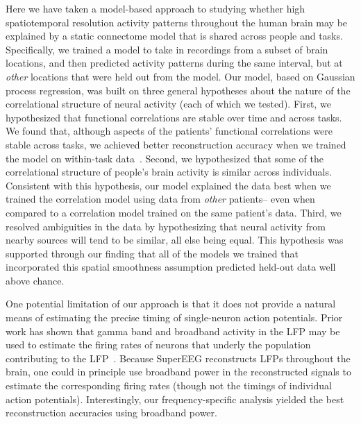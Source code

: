 \documentclass[11pt]{article}
\begin{document}
Here we have taken a model-based approach to studying whether high
spatiotemporal resolution activity patterns throughout the human brain
may be explained by a static connectome model that is shared across
people and tasks.  Specifically, we trained a model to take in
recordings from a subset of brain locations, and then predicted
activity patterns during the same interval, but at \textit{other}
locations that were held out from the model.  Our model, based on
Gaussian process regression, was built on three general hypotheses
about the nature of the correlational structure of neural activity
(each of which we tested).  First, we hypothesized that functional
correlations are stable over time and across tasks.  We found that,
although aspects of the patients' functional correlations were
stable across tasks, we achieved better reconstruction accuracy when
we trained the model on within-task data~\citep[we acknowledge that
our general approach could potentially be extended to better model
across-task changes, following][and others]{ColeEtal16, TavoEtal16}.
Second, we hypothesized that some of the correlational structure of
people's brain activity is similar across individuals.  Consistent
with this hypothesis, our model explained the data best when we
trained the correlation model using data from \textit{other}
patients-- even when compared to a correlation model trained on the
same patient's data.  Third, we resolved ambiguities in the data by
hypothesizing that neural activity from nearby sources will tend to be
similar, all else being equal.  This hypothesis was supported through
our finding that all of the models we trained that incorporated this
spatial smoothness assumption predicted held-out data well above chance.

One potential limitation of our approach is that it does not provide a
natural means of estimating the precise timing of single-neuron action
potentials.  Prior work has shown that gamma band and broadband
activity in the LFP may be used to estimate the firing rates of
neurons that underly the population contributing to the
LFP~\citep{MillEtal08, MannEtal09, JacoEtal10b, CronEtal11}.  Because
SuperEEG reconstructs LFPs throughout the brain, one could in
principle use broadband power in the reconstructed signals to
estimate the corresponding firing rates (though not the timings of
individual action potentials). Interestingly, our frequency-specific
analysis yielded the best reconstruction accuracies using broadband
power.
\end{document}
